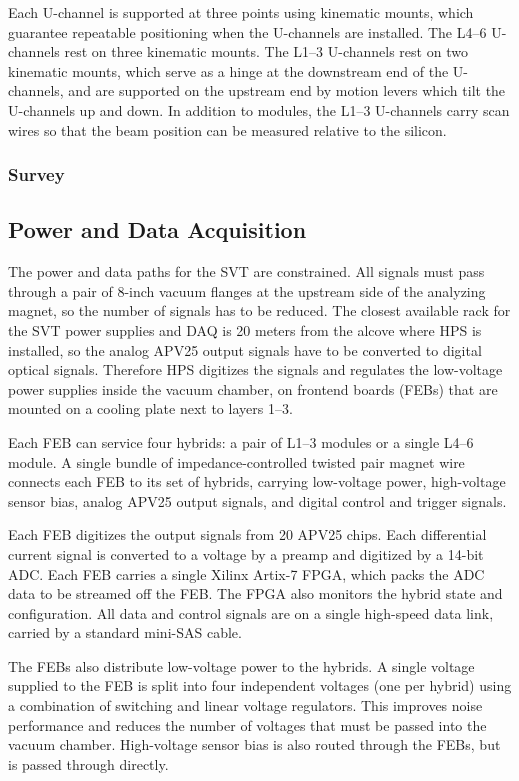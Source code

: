 Each U-channel is supported at three points using kinematic mounts, which guarantee repeatable positioning when the U-channels are installed.
The L4--6 U-channels rest on three kinematic mounts.
The L1--3 U-channels rest on two kinematic mounts, which serve as a hinge at the downstream end of the U-channels, and are supported on the upstream end by motion levers which tilt the U-channels up and down.
In addition to modules, the L1--3 U-channels carry scan wires so that the beam position can be measured relative to the silicon.

\subsubsection{Survey}
\label{sec:svt_survey}

\subsection{Power and Data Acquisition}
The power and data paths for the SVT are constrained.
All signals must pass through a pair of 8-inch vacuum flanges at the upstream side of the analyzing magnet, so the number of signals has to be reduced.
The closest available rack for the SVT power supplies and DAQ is 20 meters from the alcove where HPS is installed, so the analog APV25 output signals have to be converted to digital optical signals.
Therefore HPS digitizes the signals and regulates the low-voltage power supplies inside the vacuum chamber, on frontend boards (FEBs) that are mounted on a cooling plate next to layers 1--3.

Each FEB can service four hybrids: a pair of L1--3 modules or a single L4--6 module.
A single bundle of impedance-controlled twisted pair magnet wire connects each FEB to its set of hybrids, carrying low-voltage power, high-voltage sensor bias, analog APV25 output signals, and digital control and trigger signals.

Each FEB digitizes the output signals from 20 APV25 chips.
Each differential current signal is converted to a voltage by a preamp and digitized by a 14-bit ADC.
Each FEB carries a single Xilinx Artix-7 FPGA, which packs the ADC data to be streamed off the FEB.
The FPGA also monitors the hybrid state and configuration.
All data and control signals are on a single high-speed data link, carried by a standard mini-SAS cable.

The FEBs also distribute low-voltage power to the hybrids.
A single voltage supplied to the FEB is split into four independent voltages (one per hybrid) using a combination of switching and linear voltage regulators.
This improves noise performance and reduces the number of voltages that must be passed into the vacuum chamber.
High-voltage sensor bias is also routed through the FEBs, but is passed through directly.

